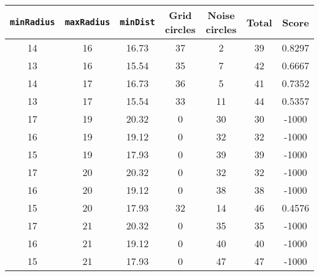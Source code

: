\documentclass[letterpaper, 12pt]{article}
\begin{document}
\begin{longtable}{|c|c|c|c|c|c|c|}
\hline
\textbf{\texttt{minRadius}} & \textbf{\texttt{maxRadius}} & \textbf{\texttt{minDist}} & \textbf{Grid circles} & \textbf{Noise circles} & \textbf{Total} & \textbf{Score} \\
\hline
14 & 16 & 16.73 & 37 & 2 & 39 & 0.8297 \\
\hline
13 & 16 & 15.54 & 35 & 7 & 42 & 0.6667 \\
\hline
14 & 17 & 16.73 & 36 & 5 & 41 & 0.7352 \\
\hline
13 & 17 & 15.54 & 33 & 11 & 44 & 0.5357 \\
\hline
17 & 19 & 20.32 & 0 & 30 & 30 & -1000 \\
\hline
16 & 19 & 19.12 & 0 & 32 & 32 & -1000 \\
\hline
15 & 19 & 17.93 & 0 & 39 & 39 & -1000 \\
\hline
17 & 20 & 20.32 & 0 & 32 & 32 & -1000 \\
\hline
16 & 20 & 19.12 & 0 & 38 & 38 & -1000 \\
\hline
15 & 20 & 17.93 & 32 & 14 & 46 & 0.4576 \\
\hline
17 & 21 & 20.32 & 0 & 35 & 35 & -1000 \\
\hline
16 & 21 & 19.12 & 0 & 40 & 40 & -1000 \\
\hline
15 & 21 & 17.93 & 0 & 47 & 47 & -1000 \\
\hline
\end{longtable}
\end{document}
